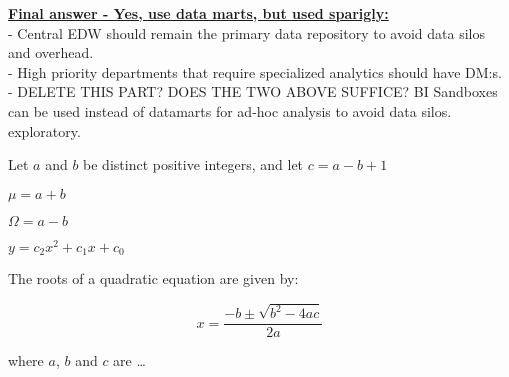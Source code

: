 \textbf{\color{red}{THIS TEXT NEEDS TO BE EXPANDED, CLEARER MOTIVATION AS TO OUR CONCLUSION BEING YES TO DATAMARTS }}
\textbf{\underline{Final answer - Yes, use data marts, but used sparigly:}}\\
- Central EDW should remain the primary data repository to avoid data silos and overhead.\\
- High priority departments that require specialized analytics should have DM:s.\\
- {\color{red} DELETE THIS PART? DOES THE TWO ABOVE SUFFICE?} BI Sandboxes can be used instead of datamarts for ad-hoc analysis to avoid data silos.
exploratory.

\newpage 
Let $a$ and $b$ be distinct positive integers, and let $c = a - b + 1$

$\mu = a + b $


$\Omega = a - b $

$y = c_2 x^2 + c_1 x + c_0 $

The roots of a quadratic equation are given by:

\begin{equation}
x = \frac{-b \pm \sqrt{b^2 - 4ac}} {2a}
\end{equation}

where $a$, $b$ and $c$ are \ldots
